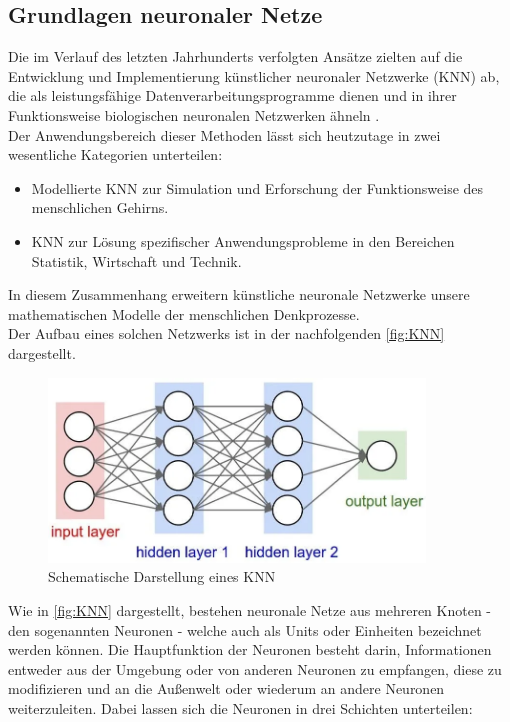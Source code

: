 \documentclass[a4paper, 12pt]{article}
\begin{document}
\newpage %

\subsection{Grundlagen neuronaler Netze}\label{chapter..2.2}
Die im Verlauf des letzten Jahrhunderts verfolgten Ansätze zielten auf die Entwicklung und 
Implementierung künstlicher neuronaler Netzwerke (KNN) ab, die als leistungsfähige 
Datenverarbeitungsprogramme dienen und in ihrer Funktionsweise biologischen neuronalen Netzwerken 
ähneln \cite{rey2019neuronale}.\\
Der Anwendungsbereich dieser Methoden lässt sich heutzutage in zwei wesentliche Kategorien 
unterteilen:\\

\begin{itemize}
	\item Modellierte KNN zur Simulation und Erforschung der Funktionsweise des menschlichen 
			Gehirns.
    \item KNN zur Lösung spezifischer Anwendungsprobleme in den Bereichen Statistik, Wirtschaft 
			und Technik.
\end{itemize}

In diesem Zusammenhang erweitern künstliche neuronale Netzwerke unsere mathematischen Modelle der 
menschlichen Denkprozesse.\\
Der Aufbau eines solchen Netzwerks ist in der nachfolgenden \autoref{fig:KNN} dargestellt.

\begin{figure}[h]
	\begin{center}
		\includegraphics[width=10cm]{Bilders/KNN.png}
		\caption{Schematische Darstellung eines KNN\cite{rahman2023}}
		\label{fig:KNN}
	\end{center}
\end{figure}

Wie in \autoref{fig:KNN} dargestellt, bestehen neuronale Netze aus mehreren Knoten - den sogenannten 
Neuronen - welche auch als Units oder Einheiten bezeichnet werden können. Die Hauptfunktion der 
Neuronen besteht darin, Informationen entweder aus der Umgebung oder von anderen Neuronen zu 
empfangen, diese zu modifizieren und an die Außenwelt oder wiederum an andere Neuronen 
weiterzuleiten. Dabei lassen sich die Neuronen in drei Schichten unterteilen:
\end{document}
